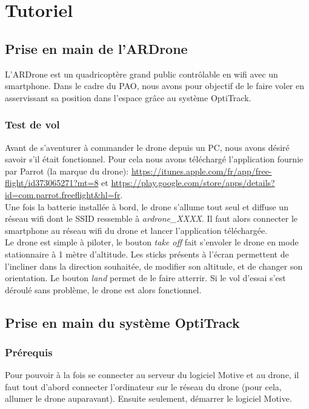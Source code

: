 \chapter{Tutoriel}
    \section{Prise en main de l'ARDrone}
        L'ARDrone est un quadricoptère grand public contrôlable en wifi avec un smartphone. Dans le cadre du PAO, nous avons pour objectif de le faire voler en asservissant sa position dans l'espace grâce au système OptiTrack.

        \subsection{Test de vol}
            Avant de s'aventurer à commander le drone depuis un PC, nous avons désiré savoir s'il était fonctionnel. Pour cela nous avons téléchargé l'application fournie par Parrot (la marque du drone): \url{https://itunes.apple.com/fr/app/free-flight/id373065271?mt=8} et \url{https://play.google.com/store/apps/details?id=com.parrot.freeflight&hl=fr}. \\

            Une fois la batterie installée à bord, le drone s'allume tout seul et diffuse un réseau wifi dont le SSID ressemble à \textit{ardrone\_XXXX}. Il faut alors connecter le smartphone au réseau wifi du drone et lancer l'application téléchargée. \\

            Le drone est simple à piloter, le bouton \textit{take off} fait s'envoler le drone en mode stationnaire à 1 mètre d'altitude. Les sticks présents à l'écran permettent de l'incliner dans la direction souhaitée, de modifier son altitude, et de changer son orientation. Le bouton \textit{land} permet de le faire atterrir. Si le vol d'essai s'est déroulé sans problème, le drone est alors fonctionnel.


    \section{Prise en main du système OptiTrack}
        \subsection{Prérequis}
            Pour pouvoir à la fois se connecter au serveur du logiciel Motive et au drone, il faut tout d'abord connecter l'ordinateur sur le réseau du drone (pour cela, allumer le drone auparavant). Ensuite seulement, démarrer le logiciel Motive.

